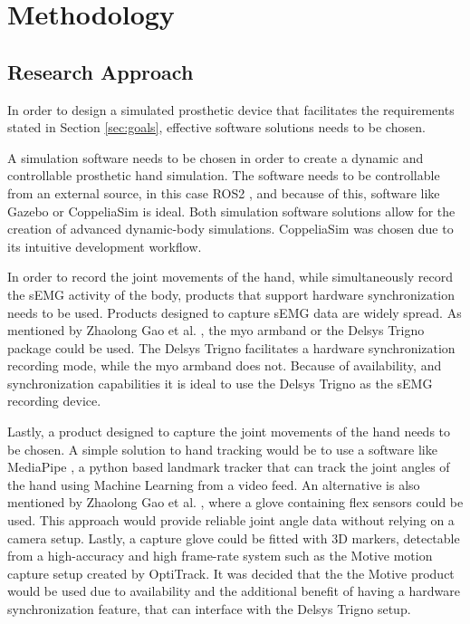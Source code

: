 \documentclass[../main.tex]{subfiles}
\begin{document}
\section{Methodology}

\subsection{Research Approach}
\label{sec:software}

In order to design a simulated prosthetic device that facilitates the requirements stated in Section \ref{sec:goals}, effective software solutions needs to be chosen.

A simulation software needs to be chosen in order to create a dynamic and controllable prosthetic hand simulation.
The software needs to be controllable from an external source, in this case ROS2 \cite{ros2}, and because of this, software like Gazebo \cite{gazebo} or CoppeliaSim \cite{coppeliasim} is ideal.
Both simulation software solutions allow for the creation of advanced dynamic-body simulations.
CoppeliaSim \cite{coppeliasim} was chosen due to its intuitive development workflow.

In order to record the joint movements of the hand, while simultaneously record the \gls{sEMG} activity of the body, products that support hardware synchronization needs to be used.
Products designed to capture \gls{sEMG} data are widely spread.
As mentioned by Zhaolong Gao et al. \cite{Zhaolong2021}, the myo armband \cite{myo} or the Delsys Trigno package \cite{emgworks} could be used.
The Delsys Trigno \cite{emgworks} facilitates a hardware synchronization recording mode, while the myo armband \cite{myo} does not.
Because of availability, and synchronization capabilities it is ideal to use the Delsys Trigno as the \gls{sEMG} recording device.

Lastly, a product designed to capture the joint movements of the hand needs to be chosen.
A simple solution to hand tracking would be to use a software like MediaPipe \cite{mediapipe}, a python based landmark tracker that can track the joint angles of the hand using Machine Learning from a video feed.
An alternative is  also mentioned by Zhaolong Gao et al. \cite{Zhaolong2021}, where a glove containing flex sensors could be used.
This approach would provide reliable joint angle data without relying on a camera setup.
Lastly, a capture glove could be fitted with 3D markers, detectable from a high-accuracy and high frame-rate system such as the Motive motion capture setup \cite{optitrack} created by OptiTrack.
It was decided that the the Motive product would be used due to availability and the additional benefit of having a hardware synchronization feature, that can interface with the Delsys Trigno \cite{emgworks} setup.
\end{document}
